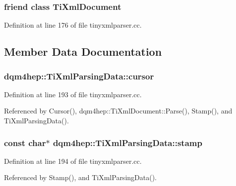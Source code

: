 \subsubsection[{Ti\+Xml\+Document}]{\setlength{\rightskip}{0pt plus 5cm}friend class {\bf Ti\+Xml\+Document}\hspace{0.3cm}{\ttfamily [friend]}}\label{classdqm4hep_1_1TiXmlParsingData_a173617f6dfe902cf484ce5552b950475}


Definition at line 176 of file tinyxmlparser.\+cc.



\subsection{Member Data Documentation}
\subsubsection[{cursor}]{ dqm4hep\+::\+Ti\+Xml\+Parsing\+Data\+::cursor\hspace{0.3cm}{\ttfamily [private]}}\label{classdqm4hep_1_1TiXmlParsingData_ad5dc16da7b0c53f1102bcf70114b592f}


Definition at line 193 of file tinyxmlparser.\+cc.



Referenced by Cursor(), dqm4hep\+::\+Ti\+Xml\+Document\+::\+Parse(), Stamp(), and Ti\+Xml\+Parsing\+Data().

\subsubsection[{stamp}]{\setlength{\rightskip}{0pt plus 5cm}const char$\ast$ dqm4hep\+::\+Ti\+Xml\+Parsing\+Data\+::stamp\hspace{0.3cm}{\ttfamily [private]}}\label{classdqm4hep_1_1TiXmlParsingData_a8065fe9cac00082358f6988a1135d53a}


Definition at line 194 of file tinyxmlparser.\+cc.



Referenced by Stamp(), and Ti\+Xml\+Parsing\+Data().

